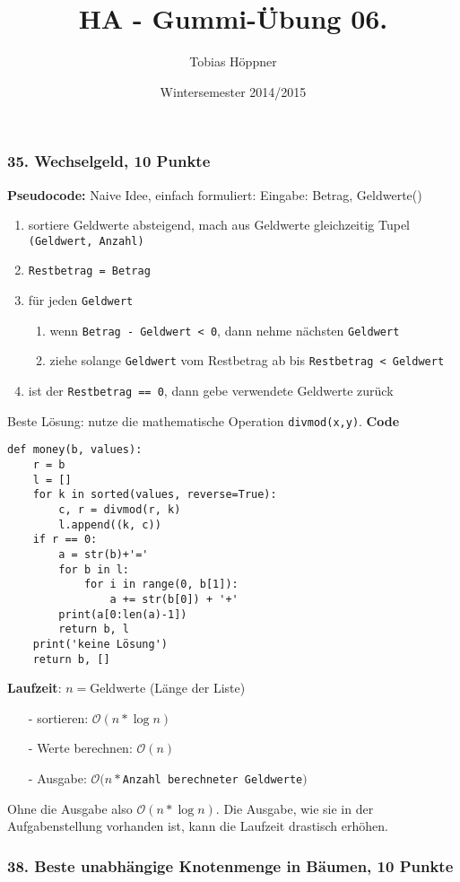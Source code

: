 \documentclass[ngerman,a4paper]{report}
\author{Tobias Höppner}
\title{HA - Gummi-Übung 06.}
\date{Wintersemester 2014/2015}
\renewcommand{\maketitle}{}
\begin{document}
 
\maketitle 

\subsubsection*{35. Wechselgeld, 10 Punkte}
\textbf{Pseudocode:} Naive Idee, einfach formuliert:
Eingabe: Betrag, Geldwerte()
\begin{enumerate}
\item sortiere Geldwerte absteigend, mach aus Geldwerte gleichzeitig Tupel \lstinline!(Geldwert, Anzahl)!
\item \lstinline!Restbetrag = Betrag!
\item für jeden \lstinline!Geldwert!
\begin{enumerate}
\item wenn \lstinline!Betrag - Geldwert < 0!, dann nehme nächsten \lstinline!Geldwert!
\item ziehe solange \lstinline!Geldwert! vom Restbetrag ab bis \lstinline!Restbetrag < Geldwert!
\end{enumerate}
\item ist der \lstinline!Restbetrag == 0!, dann gebe verwendete Geldwerte zurück
\end{enumerate}
Beste Lösung: nutze die mathematische Operation \lstinline!divmod(x,y)!. 
\textbf{Code}
\begin{lstlisting}
def money(b, values):
    r = b
    l = []
    for k in sorted(values, reverse=True):
        c, r = divmod(r, k)
        l.append((k, c))
    if r == 0:
        a = str(b)+'='
        for b in l:
            for i in range(0, b[1]):
                a += str(b[0]) + '+'
        print(a[0:len(a)-1])
        return b, l
    print('keine Lösung')
    return b, []
\end{lstlisting}
\textbf{Laufzeit}: $n = $Geldwerte (Länge der Liste)
\begin{enumerate}
\item[-] sortieren: $\mathcal{O}(n * \log n)$
\item[-] Werte berechnen: $\mathcal{O}(n)$
\item[-] Ausgabe: $\mathcal{O}(n * $\lstinline!Anzahl berechneter Geldwerte!$)$
\end{enumerate}
Ohne die Ausgabe also $\mathcal{O}(n * \log n)$. Die Ausgabe, wie sie in der Aufgabenstellung vorhanden ist, kann die Laufzeit drastisch erhöhen.\\
\subsubsection*{38. Beste unabhängige Knotenmenge in Bäumen, 10 Punkte}
\end{document}
